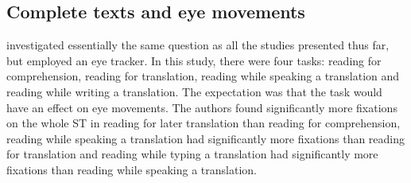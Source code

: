\documentclass[output=paper]{LSP/langsci}
\begin{document}

\subsection{Complete texts and eye movements}

\citet{Jakobsen2008a} investigated essentially the same question as all the studies presented thus far, but employed an eye tracker. In this study, there were four tasks: reading for comprehension, reading for translation, reading while speaking a translation and reading while writing a translation. The expectation was that the task would have an effect on eye movements. The authors found significantly more fixations on the whole ST in reading for later translation than reading for comprehension, reading while speaking a translation had significantly more fixations than reading for translation and reading while typing a translation had significantly more fixations than reading while speaking a translation.
\end{document}
